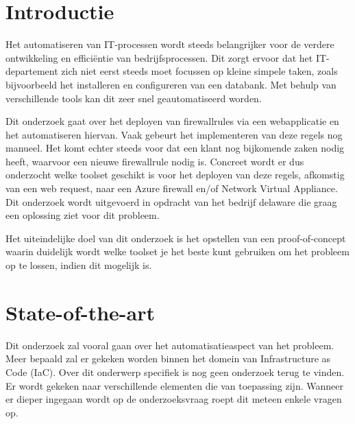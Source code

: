 
\section{Introductie}%
\label{sec:introductie}



Het automatiseren van IT-processen wordt \newline steeds belangrijker voor de verdere ontwikkeling en efficiëntie van bedrijfsprocessen. Dit zorgt ervoor dat het IT-departement zich niet eerst steeds moet focussen op kleine simpele taken, zoals bijvoorbeeld het installeren en configureren van een databank. Met behulp van verschillende tools kan dit zeer snel geautomatiseerd worden. 

Dit onderzoek gaat over het deployen van firewallrules via een webapplicatie en het automatiseren hiervan. Vaak gebeurt het implementeren van deze regels nog manueel. Het komt echter steeds voor dat een klant nog bijkomende zaken nodig heeft, waarvoor een nieuwe firewallrule nodig is. Concreet wordt er dus onderzocht welke toolset geschikt is voor het deployen van deze regels, afkomstig van een web request, naar een Azure firewall en/of Network Virtual Appliance. Dit onderzoek wordt uitgevoerd in opdracht van het bedrijf delaware die graag een oplossing ziet voor dit probleem. 

Het uiteindelijke doel van dit onderzoek is het opstellen van een proof-of-concept waarin duidelijk wordt welke toolset je het beste kunt gebruiken om het probleem op te lossen, indien dit mogelijk is.



\section{State-of-the-art}%
\label{sec:state-of-the-art}



Dit onderzoek zal vooral gaan over het automatisatieaspect van het probleem. Meer bepaald zal er gekeken worden binnen het domein van Infrastructure as Code (IaC).
Over dit onderwerp specifiek is nog geen onderzoek terug te vinden. Er wordt gekeken naar verschillende elementen die van toepassing zijn. Wanneer er dieper ingegaan wordt op de onderzoeksvraag roept dit meteen enkele vragen op. 


